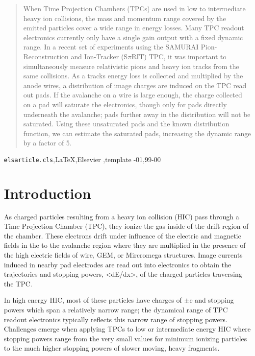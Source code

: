 \documentclass[review]{elsarticle}
\begin{document}
\begin{frontmatter}
\begin{abstract}
When Time Projection Chambers (TPCs) are used in low to intermediate heavy ion collisions, the mass and momentum range covered by the emitted particles cover a wide range in energy losses. Many TPC readout electronics currently only have a single gain output with a fixed dynamic range. In a recent set of experiments using the SAMURAI Pion-Reconstruction and Ion-Tracker (S$\pi$RIT) TPC, it was important to simultaneously measure relativistic pions and heavy ion tracks from the same collisions. As a tracks energy loss is collected and multiplied by the anode wires, a distribution of image charges are induced on the TPC read out pads. If the avalanche on a wire is large enough, the charge collected on a pad will saturate the electronics, though only for pads directly underneath the avalanche; pads further away in the distribution will not be saturated. Using these unsaturated pads and the known distribution function, we can estimate the saturated pads, increasing the dynamic range by a factor of 5.

\end{abstract}

\begin{keyword}
\texttt{elsarticle.cls}\sep \LaTeX\sep Elsevier \sep template
-01\sep  99-00
\end{keyword}

\end{frontmatter}

\linenumbers

\section{Introduction} 

As charged particles resulting from a heavy ion collision (HIC) pass through a Time Projection Chamber (TPC), they ionize the gas inside of the drift region of the chamber. These electrons drift under influence of the electric and magnetic fields in the to the avalanche region where they are multiplied in the presence of the high electric fields of wire, GEM, or Mircromega structures. Image currents induced in nearby pad electrodes are read out into electronics to obtain the trajectories and stopping powers, <dE/dx>, of the charged particles traversing the TPC.

In high energy  HIC, most of these particles have charges of $\pm$e and stopping powers which span a relatively narrow range; the dynamical range of TPC readout electronics typically reflects this narrow range of stopping powers. Challenges emerge when applying TPCs to low or intermediate energy HIC where stopping powers range from the very small values for minimum ionizing particles to the much higher stopping powers of slower moving, heavy fragments. 
\end{document}
